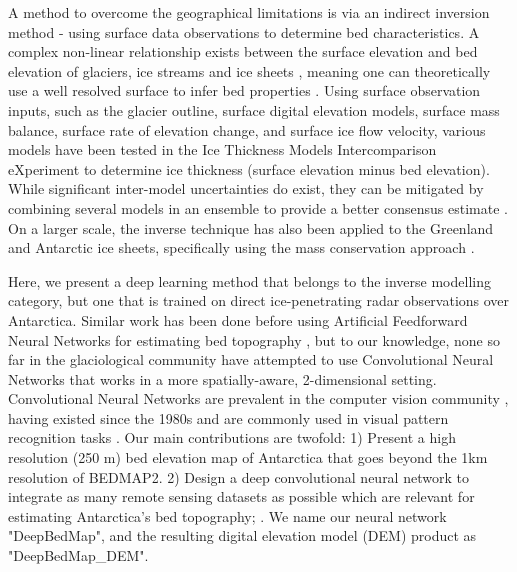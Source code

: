 \documentclass[tc, manuscript]{copernicus}
\begin{document}
A method to overcome the geographical limitations is via an indirect inversion method - using surface data observations to determine bed characteristics.
A complex non-linear relationship exists between the surface elevation and bed elevation of glaciers, ice streams and ice sheets \citep{Raymondrelationshipsurfacebasal2005}, meaning one can theoretically use a well resolved surface to infer bed properties \citep[e.g.][]{Farinottimethodestimateice2009}.
Using surface observation inputs, such as the glacier outline, surface digital elevation models, surface mass balance, surface rate of elevation change, and surface ice flow velocity, various models have been tested in the Ice Thickness Models Intercomparison eXperiment \citep[ITMIX,][]{FarinottiHowaccurateare2017} to determine ice thickness (surface elevation minus bed elevation).
While significant inter-model uncertainties do exist, they can be mitigated by combining several models in an ensemble to provide a better consensus estimate \citep{Farinotticonsensusestimateice2019}.
On a larger scale, the inverse technique has also been applied to the Greenland \citep{MorlighemBedMachinev3Complete2017} and Antarctic \citep{MorlighemDeepglacialtroughs2019} ice sheets, specifically using the mass conservation approach \citep{Morlighemmassconservationapproach2011}.

Here, we present a deep learning method that belongs to the inverse modelling category, but one that is trained on direct ice-penetrating radar observations over Antarctica.
Similar work has been done before using Artificial Feedforward Neural Networks for estimating bed topography \citep[e.g.][]{ClarkeNeuralNetworksApplied2009,MonnierInferencebedtopography2018}, but to our knowledge, none so far in the glaciological community have attempted to use Convolutional Neural Networks that works in a more spatially-aware, 2-dimensional setting.
Convolutional Neural Networks are prevalent in the computer vision community \citep[see][for a review]{LeCunDeeplearning2015}, having existed since the 1980s \citep{FukushimaNeocognitronnewalgorithm1982,LeCunBackpropagationAppliedHandwritten1989} and are commonly used in visual pattern recognition tasks \citep[e.g.][]{LecunGradientbasedlearningapplied1998,KrizhevskyImageNetClassificationDeep2012}.
Our main contributions are twofold:
1) Present a high resolution (250 m) bed elevation map of Antarctica that goes beyond the 1km resolution of BEDMAP2.
2) Design a deep convolutional neural network to integrate as many remote sensing datasets as possible which are relevant for estimating Antarctica's bed topography;
 \citep{FretwellBedmap2improvedice2013}.
We name our neural network "DeepBedMap", and the resulting digital elevation model (DEM) product as "DeepBedMap\_DEM".
\end{document}
